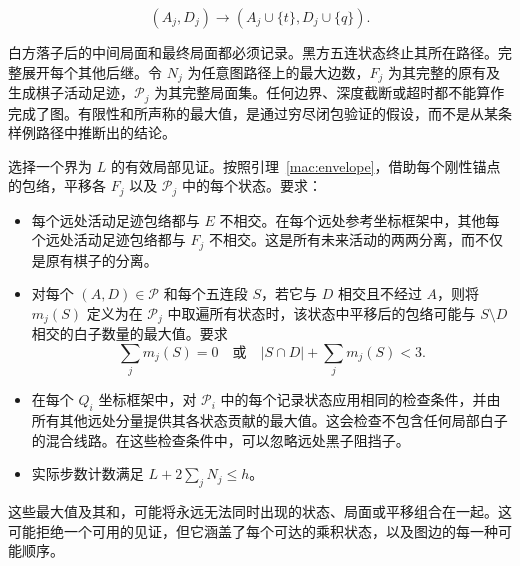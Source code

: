\documentclass[11pt]{article}
\theoremstyle{definition}
\theoremstyle{remark}
\begin{document}
\[
(A_j,D_j)\longrightarrow(A_j\cup\{t\},D_j\cup\{q\}).
\]

白方落子后的中间局面和最终局面都必须记录。黑方五连状态终止其所在路径。完整展开每个其他后继。令 \(N_j\) 为任意图路径上的最大边数，\(F_j\) 为其完整的原有及生成棋子活动足迹，\(\mathcal P_j\) 为其完整局面集。任何边界、深度截断或超时都不能算作完成了图。有限性和所声称的最大值，是通过穷尽闭包验证的假设，而不是从某条样例路径中推断出的结论。

选择一个界为 \(L\) 的有效局部见证。按照引理~\ref{mac:envelope}，借助每个刚性锚点的包络，平移各 \(F_j\) 以及 \(\mathcal P_j\) 中的每个状态。要求：

\begin{itemize}
\item 每个远处活动足迹包络都与 \(E\) 不相交。在每个远处参考坐标框架中，其他每个远处活动足迹包络都与 \(F_j\) 不相交。这是所有未来活动的两两分离，而不仅是原有棋子的分离。
\item 对每个 \((A,D)\in\mathcal P\) 和每个五连段 \(S\)，若它与 \(D\) 相交且不经过 \(A\)，则将 \(m_j(S)\) 定义为在 \(\mathcal P_j\) 中取遍所有状态时，该状态中平移后的包络可能与 \(S\setminus D\) 相交的白子数量的最大值。要求
  \[
  \sum_jm_j(S)=0\quad\text{或}\quad |S\cap D|+\sum_jm_j(S)<3.\tag{MI}
  \]
\item 在每个 \(Q_i\) 坐标框架中，对 \(\mathcal P_i\) 中的每个记录状态应用相同的检查条件，并由所有其他远处分量提供其各状态贡献的最大值。这会检查不包含任何局部白子的混合线路。在这些检查条件中，可以忽略远处黑子阻挡子。
\item 实际步数计数满足 \(L+2\sum_jN_j\le h\)。

\end{itemize}
这些最大值及其和，可能将永远无法同时出现的状态、局面或平移组合在一起。这可能拒绝一个可用的见证，但它涵盖了每个可达的乘积状态，以及图边的每一种可能顺序。
\end{document}
